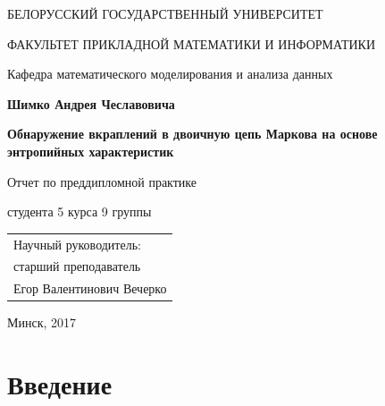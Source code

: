 ﻿\documentclass[a4paper,12pt]{article}
\theoremstyle{plain}
\begin{document}
\thispagestyle{empty}


\begin{center}
	\MakeTextUppercase{Белорусский Государственный Университет}\par 
	\MakeTextUppercase{Факультет Прикладной Математики и Информатики}\par
	Кафедра математического моделирования и анализа данных
	\par
\end{center}

\vspace*{3cm}
\begin{center}
	{\bf \large Шимко Андрея Чеславовича}
\end{center}
\vspace*{1cm}
\begin{center}
	{\bf \large Обнаружение вкраплений в двоичную цепь Маркова на основе энтропийных характеристик}
\end{center}

\vspace*{1cm}

\begin{center}
	Отчет по преддипломной практике
\end{center}
\begin{center}
	студента 5 курса 9 группы
\end{center}


\vspace{5cm}

\begin{flushright}
	\begin{tabular}{l}
		Научный руководитель:\\
		старший преподаватель\\
		Егор Валентинович Вечерко
	\end{tabular}
\end{flushright}


\par\vspace*{\fill}

\begin{center}
	{Минск, 2017}
\end{center}
\newpage


\thispagestyle{empty}

 
\clearpage

\newpage
\section{Введение}
\vspace*{1cm}
\end{document}
